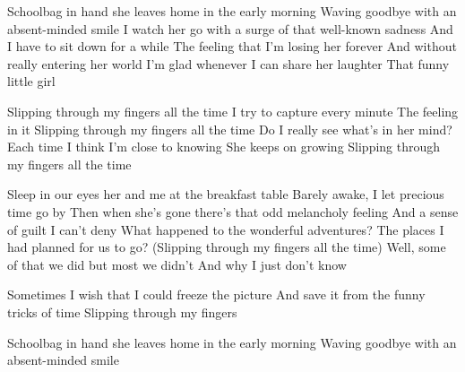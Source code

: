 \ve{}
Schoolbag in hand
she leaves home in the early morning
Waving goodbye with an absent-minded smile
I watch her go with a surge
of that well-known sadness
And I have to sit down for a while
The feeling that I'm losing her forever
And without really entering her world
I'm glad whenever I can share her laughter
That funny little girl

\cho{}
Slipping through my fingers all the time
I try to capture every minute
The feeling in it
Slipping through my fingers all the time
Do I really see what's in her mind?
Each time I think I'm close to knowing
She keeps on growing
Slipping through my fingers all the time

\ve{}
Sleep in our eyes
her and me at the breakfast table
Barely awake, I let precious time go by
Then when she's gone
there's that odd melancholy feeling
And a sense of guilt I can't deny
What happened to the wonderful adventures?
The places I had planned for us to go?
(Slipping through my fingers all the time)
Well, some of that we did
but most we didn't
And why I just don't know

\cho{}
Sometimes I wish that I could freeze the picture
And save it from the funny tricks of time
Slipping through my fingers

\ve{}
Schoolbag in hand
she leaves home in the early morning
Waving goodbye with an absent-minded smile
\esong{}
